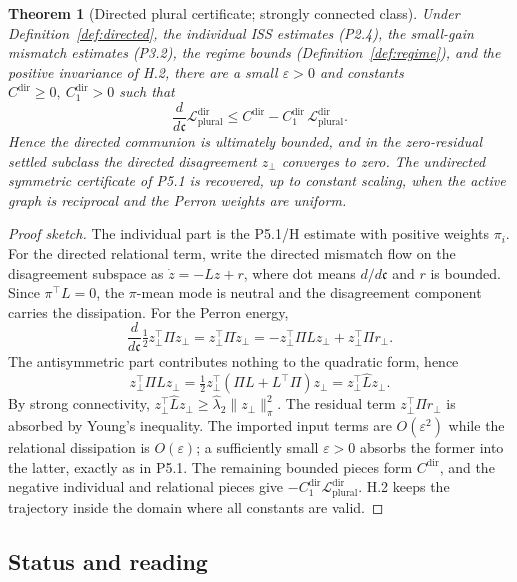 \documentclass[11pt,a4paper]{article}
\theoremstyle{definition}
\theoremstyle{plain}
\newtheorem{theorem}[definition]{Theorem}
\theoremstyle{remark}
\begin{document}
\begin{theorem}[Directed plural certificate; strongly connected class]\label{thm:directed}
Under Definition~\ref{def:directed}, the individual ISS estimates (P2.4), the small-gain
mismatch estimates (P3.2), the regime bounds (Definition~\ref{def:regime}), and the positive
invariance of H.2, there are a small \(\varepsilon>0\) and constants
\(C^{\mathrm{dir}}\ge0,\ C^{\mathrm{dir}}_1>0\) such that
\[
\frac{d}{d\mathfrak c}\mathcal L_{\mathrm{plural}}^{\mathrm{dir}}
\le
C^{\mathrm{dir}}-C^{\mathrm{dir}}_1\,\mathcal L_{\mathrm{plural}}^{\mathrm{dir}} .
\]
Hence the directed communion is ultimately bounded, and in the zero-residual settled subclass
the directed disagreement \(z_\perp\) converges to zero. The undirected symmetric certificate
of P5.1 is recovered, up to constant scaling, when the active graph is reciprocal and the
Perron weights are uniform.
\end{theorem}

\begin{proof}[Proof sketch]
The individual part is the P5.1/H estimate with positive weights \(\pi_i\). For the directed
relational term, write the directed mismatch flow on the disagreement subspace as
\(\dot z=-Lz+r\), where dot means \(d/d\mathfrak c\) and \(r\) is bounded. Since
\(\pi^\top L=0\), the \(\pi\)-mean mode is neutral and the disagreement component carries
the dissipation. For the Perron energy,
\[
\frac{d}{d\mathfrak c}\tfrac12 z_\perp^\top\Pi z_\perp
=
z_\perp^\top\Pi\dot z_\perp
=
-z_\perp^\top\Pi Lz_\perp+z_\perp^\top\Pi r_\perp .
\]
The antisymmetric part contributes nothing to the quadratic form, hence
\[
z_\perp^\top\Pi Lz_\perp
=
\tfrac12 z_\perp^\top(\Pi L+L^\top\Pi)z_\perp
=
z_\perp^\top\widehat Lz_\perp .
\]
By strong connectivity, \(z_\perp^\top\widehat Lz_\perp\ge\widehat\lambda_2\lVert z_\perp\rVert_\pi^2\).
The residual term \(z_\perp^\top\Pi r_\perp\) is absorbed by Young's inequality. The imported
input terms are \(O(\varepsilon^2)\) while the relational dissipation is \(O(\varepsilon)\);
a sufficiently small \(\varepsilon>0\) absorbs the former into the latter, exactly as in
P5.1. The remaining bounded pieces form \(C^{\mathrm{dir}}\), and the negative individual and
relational pieces give \(-C^{\mathrm{dir}}_1\mathcal L_{\mathrm{plural}}^{\mathrm{dir}}\).
H.2 keeps the trajectory inside the domain where all constants are valid. \qedhere
\end{proof}

\subsection{Status and reading}
\end{document}
